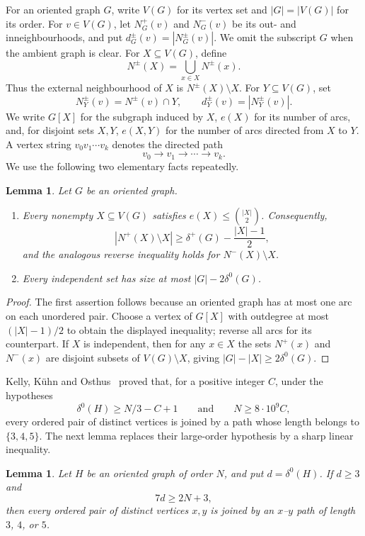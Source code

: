 \documentclass[11pt]{amsart}
\newtheorem{lemma}[theorem]{Lemma}
\theoremstyle{definition}
\begin{document}
For an oriented graph $G$, write $V(G)$ for its vertex set and
$|G|=|V(G)|$ for its order.  For $v\in V(G)$, let $N_G^+(v)$ and
$N_G^-(v)$ be its out- and inneighbourhoods, and put
$d_G^\pm(v)=|N_G^\pm(v)|$.  We omit the subscript $G$ when the ambient
graph is clear.  For $X\subseteq V(G)$, define
\[
  N^\pm(X)=\bigcup_{x\in X}N^\pm(x).
\]
Thus the external neighbourhood of $X$ is $N^\pm(X)\setminus X$.
For $Y\subseteq V(G)$, set
\[
  N_Y^\pm(v)=N^\pm(v)\cap Y,\qquad
  d_Y^\pm(v)=|N_Y^\pm(v)|.
\]
We write $G[X]$ for the subgraph induced by $X$, $e(X)$ for its number
of arcs, and, for disjoint sets $X,Y$, $e(X,Y)$ for the number of arcs
directed from $X$ to $Y$.  A vertex string $v_0v_1\cdots v_k$ denotes
the directed path
\[
  v_0\to v_1\to\cdots\to v_k.
\]
We use the following two elementary facts repeatedly.

\begin{lemma}\label{lem:elementary}
Let $G$ be an oriented graph.
\begin{enumerate}
\item Every nonempty $X\subseteq V(G)$ satisfies $e(X)\le\binom{|X|}{2}$.  Consequently,
\[
  |N^+(X)\setminus X|\ge \delta^+(G)-\frac{|X|-1}{2},
\]
and the analogous reverse inequality holds for $N^-(X)\setminus X$.
\item Every independent set has size at most $|G|-2\delta^0(G)$.
\end{enumerate}
\end{lemma}

\begin{proof}
The first assertion follows because an oriented graph has at most one arc on each unordered pair.  Choose a vertex of $G[X]$ with outdegree at most $(|X|-1)/2$ to obtain the displayed inequality; reverse all arcs for its counterpart.  If $X$ is independent, then for any $x\in X$ the sets $N^+(x)$ and $N^-(x)$ are disjoint subsets of $V(G)\setminus X$, giving $|G|-|X|\ge2\delta^0(G)$.
\end{proof}

Kelly, K\"uhn and Osthus~\cite{KKO} proved that, for a
positive integer $C$, under the hypotheses
\[
  \delta^0(H)\ge N/3-C+1
  \qquad\text{and}\qquad
  N\ge8\cdot10^9C,
\]
every ordered pair of distinct vertices is joined by a path whose
length belongs to $\{3,4,5\}$.  The next lemma replaces their
large-order hypothesis by a sharp linear inequality.

\begin{lemma}\label{lem:short-link}
Let $H$ be an oriented graph of order $N$, and put
$d=\delta^0(H)$.  If $d\ge3$ and
\[
  7d\ge2N+3,
\]
then every ordered pair of distinct vertices $x,y$ is joined by an
$x$--$y$ path of length $3$, $4$, or $5$.
\end{lemma}
\end{document}
